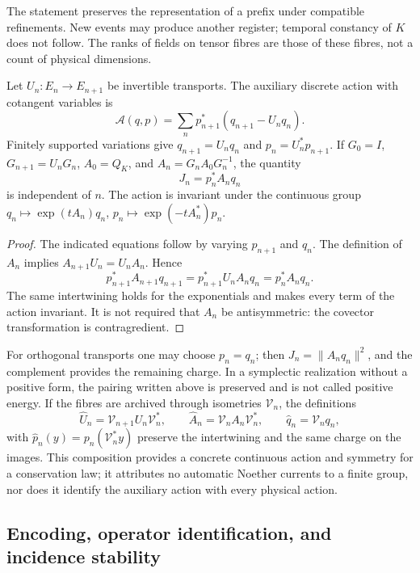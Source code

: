 The statement preserves the representation of a prefix under compatible refinements. New events may produce another register; temporal constancy of \(K\) does not follow. The ranks of fields on tensor fibres are those of these fibres, not a count of physical dimensions.

\begin{proposition}
\label{lib01:carga-noether}
Let \(U_n:E_n\to E_{n+1}\) be invertible transports. The auxiliary discrete action with cotangent variables is
\[
 \mathcal A(q,p)=\sum_n p_{n+1}^*(q_{n+1}-U_nq_n).
\]
Finitely supported variations give \(q_{n+1}=U_nq_n\) and \(p_n=U_n^*p_{n+1}\). If \(G_0=I\), \(G_{n+1}=U_nG_n\), \(A_0=Q_K\), and \(A_n=G_nA_0G_n^{-1}\), the quantity
\[
 J_n=p_n^*A_nq_n
\]
is independent of \(n\). The action is invariant under the continuous group \(q_n\mapsto\exp(tA_n)q_n\), \(p_n\mapsto\exp(-tA_n^*)p_n\).
\end{proposition}
\begin{proof}
The indicated equations follow by varying \(p_{n+1}\) and \(q_n\). The definition of \(A_n\) implies \(A_{n+1}U_n=U_nA_n\). Hence
\[
 p_{n+1}^*A_{n+1}q_{n+1}
 =p_{n+1}^*U_nA_nq_n=p_n^*A_nq_n.
\]
The same intertwining holds for the exponentials and makes every term of the action invariant. It is not required that \(A_n\) be antisymmetric: the covector transformation is contragredient.
\end{proof}

For orthogonal transports one may choose \(p_n=q_n\); then \(J_n=\|A_nq_n\|^2\), and the complement provides the remaining charge. In a symplectic realization without a positive form, the pairing written above is preserved and is not called positive energy. If the fibres are archived through isometries \(\mathcal V_n\), the definitions
\[
 \widehat U_n=\mathcal V_{n+1}U_n\mathcal V_n^*,\qquad
 \widehat A_n=\mathcal V_nA_n\mathcal V_n^*,\qquad
 \widehat q_n=\mathcal V_nq_n,
\]
with \(\widehat p_n(y)=p_n(\mathcal V_n^*y)\) preserve the intertwining and the same charge on the images. This composition provides a concrete continuous action and symmetry for a conservation law; it attributes no automatic Noether currents to a finite group, nor does it identify the auxiliary action with every physical action.

\subsection{Encoding, operator identification, and incidence stability}
\label{lib01:alcance}

